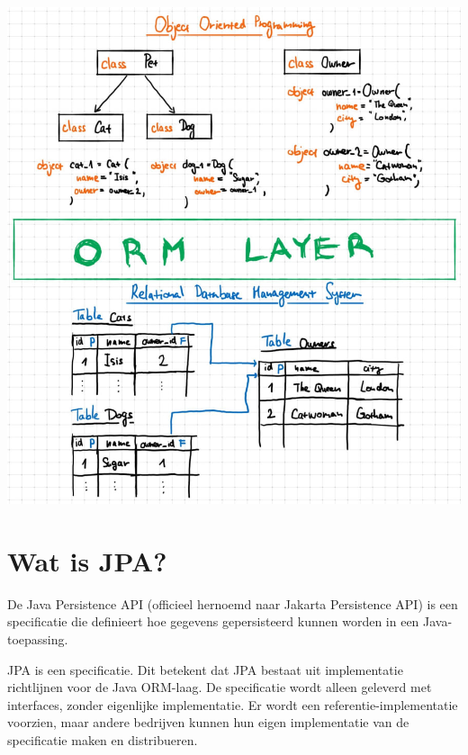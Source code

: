 \includegraphics[width=\textwidth]{./images/chapter6/orm}


\section{Wat is JPA?}

De Java Persistence API (officieel hernoemd naar Jakarta Persistence API) is een specificatie die definieert hoe gegevens gepersisteerd kunnen worden in een Java-toepassing. 

JPA is een specificatie. Dit betekent dat JPA bestaat uit implementatie richtlijnen voor de Java ORM-laag. De specificatie wordt alleen geleverd met interfaces, zonder eigenlijke implementatie.  Er wordt een referentie-implementatie voorzien, maar andere bedrijven kunnen hun eigen implementatie van de specificatie maken en distribueren.



